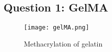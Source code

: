 \subsection{Question 1: GelMA}

\begin{figure}[H]
    \texttt{[image: gelMA.png]}
    \caption{Methacrylation of gelatin}
    \label{fig:gelMA}
\end{figure}